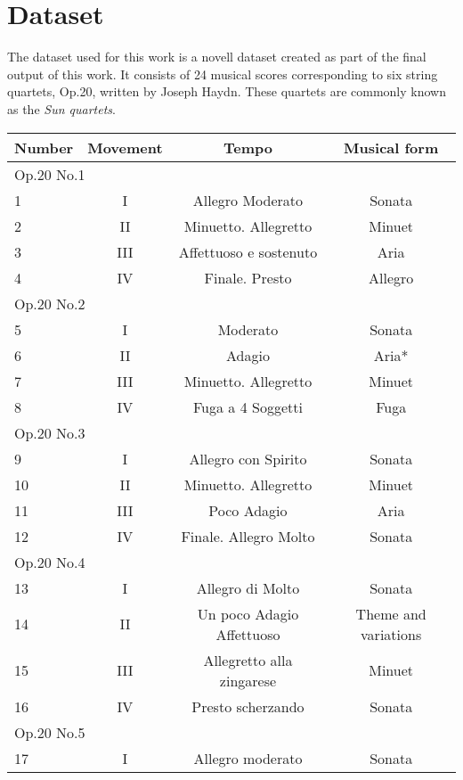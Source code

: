 \chapter{Dataset}
\label{chap:dataset}
The dataset used for this work is a novell dataset created as part of the final output of this work. It consists of 24 musical scores corresponding to six string quartets, Op.20, written by Joseph Haydn. These quartets are commonly known as the \emph{Sun quartets}.

\begin{table}[]
\centering
\begin{tabular}{|l|c|c|c|}
\hline
Number & Movement & Tempo & Musical form \\ \hline
\multicolumn{4}{|l|}{Op.20 No.1} \\ \hline
1 & I & Allegro Moderato & Sonata \\ \hline
2 & II & Minuetto. Allegretto & Minuet \\ \hline
3 & III & Affettuoso e sostenuto & Aria \\ \hline
4 & IV & Finale. Presto & Allegro \\ \hline
\multicolumn{4}{|l|}{Op.20 No.2} \\ \hline
5 & I & Moderato & Sonata \\ \hline
6 & II & Adagio & Aria* \\ \hline
7 & III & Minuetto. Allegretto & Minuet \\ \hline
8 & IV & Fuga a 4 Soggetti & Fuga \\ \hline
\multicolumn{4}{|l|}{Op.20 No.3} \\ \hline
9 & I & Allegro con Spirito & Sonata \\ \hline
10 & II & Minuetto. Allegretto & Minuet \\ \hline
11 & III & Poco Adagio & Aria \\ \hline
12 & IV & Finale. Allegro Molto & Sonata \\ \hline
\multicolumn{4}{|l|}{Op.20 No.4} \\ \hline
13 & I & Allegro di Molto & Sonata \\ \hline
14 & II & Un poco Adagio Affettuoso & Theme and variations \\ \hline
15 & III & Allegretto alla zingarese & Minuet \\ \hline
16 & IV & Presto scherzando & Sonata \\ \hline
\multicolumn{4}{|l|}{Op.20 No.5} \\ \hline
17 & I & Allegro moderato & Sonata \\ \hline

\end{tabular}
\end{table}
